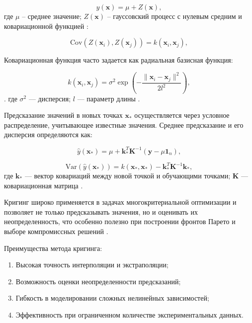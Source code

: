 \begin{equation}
    y(\mathbf{x}) = \mu + Z(\mathbf{x}),
\end{equation}
где $\mu$ -- среднее значение; $Z(\mathbf{x})$ -- гауссовский процесс с нулевым средним и
ковариационной функцией \cite{marrel2024probabilistic}:

\begin{equation}
    \text{Cov}(Z(\mathbf{x}_i), Z(\mathbf{x}_j)) = k(\mathbf{x}_i, \mathbf{x}_j),
\end{equation}

Ковариационная функция часто задается как радиальная базисная функция:

\begin{equation}
    k(\mathbf{x}_i, \mathbf{x}_j) = \sigma^2 \exp\left(-\frac{\|\mathbf{x}_i - \mathbf{x}_j\|^2}{2l^2}\right),
\end{equation}.
где \( \sigma^2 \) — дисперсия;
$l$ — параметр длины \cite{figueroa2021gaussian}.

Предсказание значений в новых точках $\mathbf{x}_*$ осуществляется через условное распределение, учитывающее известные значения.
Среднее предсказание и его дисперсия определяются как:

\begin{equation}
    \hat{y}(\mathbf{x}_*) = \mu + \mathbf{k}_*^T \mathbf{K}^{-1} (\mathbf{y} - \mu \mathbf{1}_n),
\end{equation}

\begin{equation}
    \text{Var}(\hat{y}(\mathbf{x}_*)) = k(\mathbf{x}_*, \mathbf{x}_*) - \mathbf{k}_*^T \mathbf{K}^{-1} \mathbf{k}_*,
\end{equation}
где $\mathbf{k}_*$ — вектор ковариаций между новой точкой и обучающими точками;
$\mathbf{K}$ — ковариационная матрица \cite{zhou2020enhanced}.

Кригинг широко применяется в задачах многокритериальной оптимизации и позволяет
не только предсказывать значения, но и оценивать их неопределенность, что особенно
полезно при построении фронтов Парето и выборе компромиссных решений \cite{radaideh2020surrogate}.

Преимущества метода кригинга:

\begin{enumerate}
    \item Высокая точность интерполяции и экстраполяции;
    \item Возможность оценки неопределенности предсказаний;
    \item Гибкость в моделировании сложных нелинейных зависимостей;
    \item Эффективность при ограниченном количестве экспериментальных данных.
\end{enumerate}

